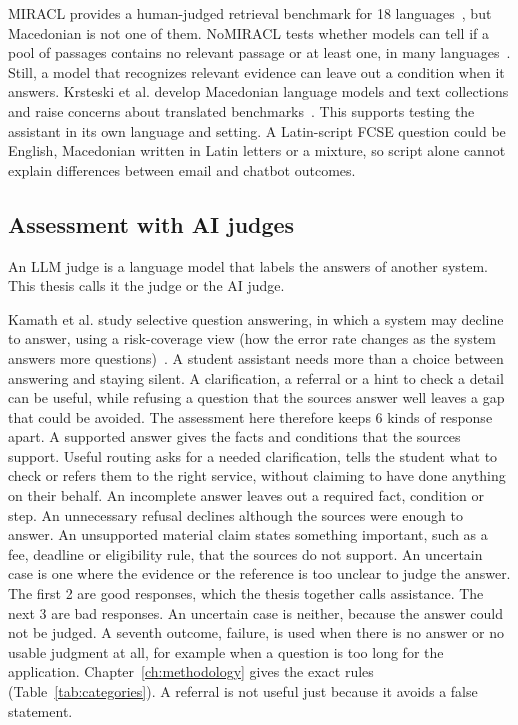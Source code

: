 MIRACL provides a human-judged retrieval benchmark for 18 languages~\cite{zhang2023miracl}, but Macedonian is not one of them. NoMIRACL tests whether models can tell if a pool of passages contains no relevant passage or at least one, in many languages~\cite{thakur2024nomiracl}. Still, a model that recognizes relevant evidence can leave out a condition when it answers. Krsteski et al. develop Macedonian language models and text collections and raise concerns about translated benchmarks~\cite{krsteski2025macedonian}. This supports testing the assistant in its own language and setting. A Latin-script FCSE question could be English, Macedonian written in Latin letters or a mixture, so script alone cannot explain differences between email and chatbot outcomes.

\subsection{Assessment with AI judges}

An LLM judge is a language model that labels the answers of another system. This thesis calls it the judge or the AI judge.

Kamath et al. study selective question answering, in which a system may decline to answer, using a risk-coverage view (how the error rate changes as the system answers more questions)~\cite{kamath2020selective}. A student assistant needs more than a choice between answering and staying silent. A clarification, a referral or a hint to check a detail can be useful, while refusing a question that the sources answer well leaves a gap that could be avoided. The assessment here therefore keeps 6 kinds of response apart. A supported answer gives the facts and conditions that the sources support. Useful routing asks for a needed clarification, tells the student what to check or refers them to the right service, without claiming to have done anything on their behalf. An incomplete answer leaves out a required fact, condition or step. An unnecessary refusal declines although the sources were enough to answer. An unsupported material claim states something important, such as a fee, deadline or eligibility rule, that the sources do not support. An uncertain case is one where the evidence or the reference is too unclear to judge the answer. The first 2 are good responses, which the thesis together calls assistance. The next 3 are bad responses. An uncertain case is neither, because the answer could not be judged. A seventh outcome, failure, is used when there is no answer or no usable judgment at all, for example when a question is too long for the application. Chapter~\ref{ch:methodology} gives the exact rules (Table~\ref{tab:categories}). A referral is not useful just because it avoids a false statement.

